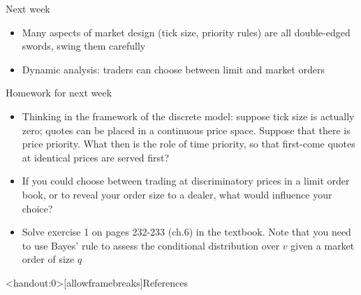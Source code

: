 \documentclass[english,10pt
,aspectratio=169
]{beamer}
\begin{document}
\begin{frame}{Next week}
	\begin{itemize}
		\item Many aspects of market design (tick size, priority rules) are all double-edged swords, swing them carefully
		\item Dynamic analysis: traders can choose between limit and market orders
	\end{itemize}
\end{frame}


\begin{frame}{Homework for next week}
	\begin{itemize}
		\item Thinking in the framework of the discrete model: suppose tick size is actually zero; quotes can be placed in a continuous price space. Suppose that there is price priority. What then is the role of time priority, so that first-come quotes at identical prices are served first?
		\item If you could choose between trading at discriminatory prices in a limit order book, or to reveal your order size to a dealer, what would influence your choice?
		\item Solve exercise 1 on pages 232-233 (ch.6) in the textbook. Note that you need to use Bayes' rule to assess the conditional distribution over $v$ given a market order of size $q$
	\end{itemize}
\end{frame}





\appendix
\begin{frame}<handout:0>[allowframebreaks]{References}
	
	
\end{frame}
\end{document}
